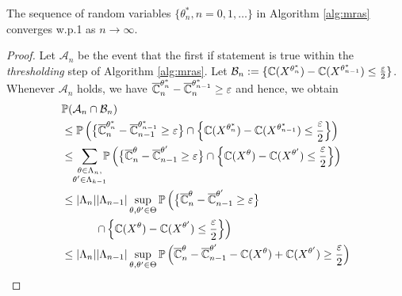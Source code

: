 
\begin{lemma}\label{lemma:iofo}
    The sequence of random variables $\{\theta^*_n,n=0,1,\ldots \}$ in Algorithm \ref{alg:mras} converges w.p.1 as $n\rightarrow \infty$.
\end{lemma}
\begin{proof}
    Let $\mathcal{A}_n$ be the event that the first if statement is true within the \textit{thresholding} step of Algorithm \ref{alg:mras}. Let $\mathcal{B}_n:=\{\mathbb{C}(X^{\theta^*_{n}})-\mathbb{C}(X^{\theta^*_{n-1}})\leq \frac{\varepsilon}{2}\}$.
    Whenever $\mathcal{A}_n$ holds, we have $\overline {\mathbb{C}}_n^{\theta^*_{n}}-\overline {\mathbb{C}}_n^{\theta^*_{n-1}}\geq \varepsilon$ and hence, we obtain
\begin{align*}
&\mathbb{P}(\mathcal{A}_{n}\cap \mathcal{B}_n) \\
&\leq \mathbb{P} 
\left(\big\{\overline \C_n^{\theta^*_{n}}-\overline \C_{n-1}^{\theta^*_{n-1}}\geq \varepsilon\big\}\cap \left\{\C(X^{\theta^*_{n}})-\C(X^{\theta^*_{n-1}})\leq \frac{\varepsilon}{2}\right\}\right)\\
&\leq \!\! \sum_{\substack{\theta\in \Lambda_n,\\\theta'\in \Lambda_{k-1}}}\!\!\!\mathbb{P}\left(\big\{\overline \C_n^{\theta}-\overline \C_{n-1}^{\theta'}\geq \varepsilon\big\} \cap
\left\{\C(X^{\theta})-\C(X^{\theta'})\leq \frac{\varepsilon}{2}\right\}\right) \\
&\leq  |\Lambda_n||\Lambda_{n-1}|\sup_{\theta,\theta'\in \Theta}\mathbb{P}\left(\big\{\overline \C_n^{\theta}-\overline \C_{n-1}^{\theta'}\geq \varepsilon\big\} \right.\\
&\quad\qquad \left.\cap \left\{\C(X^{\theta})-\C(X^{\theta'})\leq \frac{\varepsilon}{2}\right\} \right) \\
&\leq |\Lambda_n||\Lambda_{n-1}|\sup_{\theta,\theta'\in \Theta}\mathbb{P}\left(\overline \C_n^{\theta}-\overline \C_{n-1}^{\theta'}-\C(X^{\theta})+\C(X^{\theta'})\geq \frac{\varepsilon}{2}\right) \\

\end{align*}
\end{proof}
